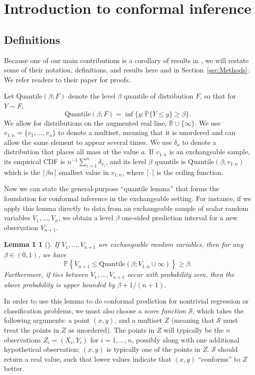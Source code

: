 \documentclass[10.5pt, letterpaper]{article}
\numberwithin{table}{section}
\numberwithin{figure}{section}
\numberwithin{equation}{section}
\newtheorem*{lemma1}{Lemma 1}
\begin{document}
\section{Introduction to conformal inference}\label{sec:Intuition}

\subsection{Definitions}

Because one of our main contributions is a corollary of results in \cite{tibshirani2019conformal}, we will restate some of their notation, definitions, and results here and in Section~\ref{sec:Methods}. We refer readers to their paper for proofs.

Let $\mathrm{Quantile}(\beta; F)$ denote the level $\beta$ quantile of distribution $F$, so that for $Y\sim F$,
\[\mathrm{Quantile}(\beta;F) = \inf \{y: \mathbb{P}\{Y \leq y\} \geq \beta\}. \]
We allow for distributions on the augmented real line, $\mathbb{R} \cup \{\infty\}$. We use $v_{1{:}n}=\{v_1,\ldots,v_n\}$ to denote a multiset, meaning that it is unordered and can allow the same element to appear several times. We use $\delta_a$ to denote a distribution that places all mass at the value $a$. If $v_{1{:}n}$ is an exchangeable sample, its empirical CDF is $n^{-1}\sum_{i=1}^n \delta_{v_i}$, and its level $\beta$ quantile is $\mathrm{Quantile}(\beta; v_{1{:}n})$ which is the $\lceil \beta n \rceil$ smallest value in $v_{1{:}n}$, where $\lceil \cdot \rceil$ is the ceiling function.

Now we can state the general-purpose ``quantile lemma'' that forms the foundation for conformal inference in the exchangeable setting. For instance, if we apply this lemma directly to data from an exchangeable sample of scalar random variables $V_1,\ldots,V_n$, we obtain a level $\beta$ one-sided prediction interval for a new observation $V_{n+1}$.

\begin{lemma1}[\cite{tibshirani2019conformal}]
If $V_1,\ldots, V_{n+1}$ are exchangeable random variables, then
for any $\beta\in(0,1)$, we have
\[\mathbb{P}\left\{ V_{n+1} \leq \mathrm{Quantile}\left(
\beta; V_{1{:}n} \cup {\infty}
\right) \right\} \geq \beta.\]
Furthermore, if ties between $V_1,\ldots, V_{n+1}$ occur with probability zero, then the above probability is upper bounded by $\beta + 1/(n+1)$.
\end{lemma1}


In order to use this lemma to do conformal prediction for nontrivial regression or classification problems, we must also choose a \emph{score function} $\mathcal{S}$, which takes the following arguments: a point $(x,y)$, and a multiset $Z$ (meaning that $\mathcal{S}$ must treat the points in $Z$ as unordered). The points in $Z$ will typically be the $n$ observations $Z_i=(X_i,Y_i)$ for $i=1,\ldots,n$, possibly along with one additional hypothetical observation; $(x,y)$ is typically one of the points in $Z$. $\mathcal{S}$ should return a real value, such that lower values indicate that $(x,y)$ ``conforms'' to $Z$ better.
\end{document}
